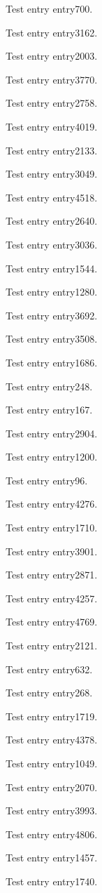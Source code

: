 Test entry \gls{entry700}.

Test entry \gls{entry3162}.

Test entry \gls{entry2003}.

Test entry \gls{entry3770}.

Test entry \gls{entry2758}.

Test entry \gls{entry4019}.

Test entry \gls{entry2133}.

Test entry \gls{entry3049}.

Test entry \gls{entry4518}.

Test entry \gls{entry2640}.

Test entry \gls{entry3036}.

Test entry \gls{entry1544}.

Test entry \gls{entry1280}.

Test entry \gls{entry3692}.

Test entry \gls{entry3508}.

Test entry \gls{entry1686}.

Test entry \gls{entry248}.

Test entry \gls{entry167}.

Test entry \gls{entry2904}.

Test entry \gls{entry1200}.

Test entry \gls{entry96}.

Test entry \gls{entry4276}.

Test entry \gls{entry1710}.

Test entry \gls{entry3901}.

Test entry \gls{entry2871}.

Test entry \gls{entry4257}.

Test entry \gls{entry4769}.

Test entry \gls{entry2121}.

Test entry \gls{entry632}.

Test entry \gls{entry268}.

Test entry \gls{entry1719}.

Test entry \gls{entry4378}.

Test entry \gls{entry1049}.

Test entry \gls{entry2070}.

Test entry \gls{entry3993}.

Test entry \gls{entry4806}.

Test entry \gls{entry1457}.

Test entry \gls{entry1740}.

